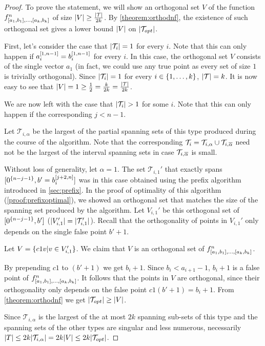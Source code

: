 \begin{proof}
To prove the statement,
we will show an orthogonal set $V$ of the function
$f^n_{[a_1, b_1], \ldots, [a_k, b_k]}$
of size
$\lvert V\rvert \geq \frac{\lvert\mathcal{T}\rvert}{2k}$.
By \autoref{theorem:orthodnf},
the existence of such orthogonal set
gives a lower bound $\lvert V\rvert$
on $\lvert\mathcal{T}_{opt}\rvert$.

First, let's consider the case that
$\lvert\mathcal{T}_i\rvert = 1$ for every $i$.
Note that this can only happen if
$a_i^{[1, n-1]} = b_i^{[1, n-1]}$ for every $i$.
In this case,
the orthogonal set $V$ consists of the single vector $a_1$
(in fact, we could use any true point
as every set of size $1$ is trivially orthogonal).
Since $\lvert\mathcal{T}_i\rvert = 1$
for every $i \in \{1, \ldots, k\}$,
$\lvert\mathcal{T}\rvert = k$.
It is now easy to see that
$\lvert V\rvert = 1
\geq \frac{1}{2} = \frac{k}{2k} =
\frac{\lvert\mathcal{T}\rvert}{2k}$.

We are now left with the case that
$\lvert\mathcal{T}_i\rvert > 1$ for some $i$.
Note that this can only happen if
the corresponding $j < n-1$.

Let $\mathcal{T}_{i, \alpha}$ be the largest
of the partial spanning sets of this type
produced during the course of the algorithm.
Note that the corresponding
$\mathcal{T}_i
= \mathcal{T}_{i, \alpha}
\cup \mathcal{T}_{i, \overline{\alpha}}$
need not be the largest of the interval spanning sets
in case
$\mathcal{T}_{i, \overline{\alpha}}$ is small.

Without loss of generality,
let $\alpha = 1$.
The set $\mathcal{T}_{i, 1}'$
that exactly spans
$[0^{\{n-j-1\}}, b' = b_i^{[j+2, n]}]$
was in this case obtained
using the prefix algorithm
introduced in \autoref{sec:prefix}.
In the proof of optimality of this algorithm
(\autoref{proof:prefixoptimal}),
we showed an orthogonal set that matches the size
of the spanning set produced by the algorithm.
Let $V_{i, 1}'$ be this orthogonal set
of $[0^{\{n-j-1\}}, b']$
($\lvert V_{i, 1}'\rvert
= \lvert\mathcal{T}_{i, 1}'\rvert$).
Recall that the orthogonality of points in $V_{i, 1}'$
only depends on the single false point $b' + 1$.

Let $V = \{c 1 v | v \in V_{i, 1}'\}$.
We claim that $V$ is an orthogonal set of
$f^n_{[a_1, b_1], \ldots, [a_k, b_k]}$.

By prepending $c 1$ to $(b' + 1)$
we get $b_i + 1$.
Since $b_i < a_{i+1} - 1$,
$b_i + 1$ is a false point of
$f^n_{[a_1, b_1], \ldots, [a_k, b_k]}$.
It follows that the points in $V$ are orthogonal,
since their orthogonality only depends on the false point
$c 1 (b' + 1) = b_i + 1$.
From \autoref{theorem:orthodnf} we get
$\lvert\mathcal{T}_{opt}\rvert \geq \lvert V\rvert$.

Since $\mathcal{T}_{i, \alpha}$ is
the largest of the at most $2k$ spanning sub-sets
of this type
and the spanning sets of the other types are singular
and less numerous,
necessarily
$\lvert T\rvert \leq 2k \lvert\mathcal{T}_{i, \alpha}\rvert
= 2k \lvert V\rvert \leq 2k \lvert\mathcal{T}_{opt}\rvert$.
\end{proof}

